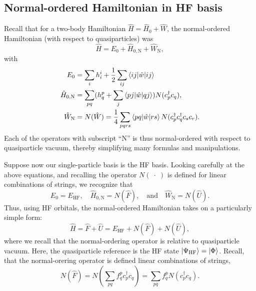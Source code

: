 \documentclass{report}
\theoremstyle{plain}
\theoremstyle{definition}
\begin{document}
\subsection{Normal-ordered Hamiltonian in HF basis}

Recall that for a two-body Hamiltonian $\hat{H} = \hat{H}_0 +
\hat{W}$, the normal-ordered Hamiltonian (with respect to
quasiparticles) was
\begin{equation}
  \hat{H} = E_0 + \hat{H}_{0,\text{N}} + \hat{W}_\text{N}, 
\end{equation}
with
\begin{align}
  E_0 &= \sum_i h^i_i + \frac{1}{2}\sum_{ij} \braket{ij|\hat{w}|ij} \\
  \hat{H}_{0,\text{N}} &= \sum_{pq} (h^p_q + \sum_j \braket{pj|\hat{w}|qj})
  N(c^\dag_p c_q), \\
  \hat{W}_\text{N} &= N(\hat{W}) = \frac{1}{4}\sum_{pqrs} \braket{pq|\hat{w}|rs} N(c^\dag_p
  c^\dag_q c_s c_r).
\end{align}
Each of the operators with subscript ``N'' is thus normal-ordered with
respect to quasiparticle vacuum, thereby simplifying many formulas and
manipulations.

Suppose now our single-particle basis is the HF basis.
Looking carefully at the above equations, and recalling the operator
$N(\; \cdot \;)$ is defined for linear combinations of strings, we recognize that
\begin{equation}
  E_0 = E_\text{HF}, \quad \hat{H}_{0,\text{N}} = N(\hat{F}), \quad\text{and}\quad \hat{W}_\text{N} =
  N(\hat{U}).
\end{equation}
Thus, using HF orbitals, the
normal-ordered Hamiltonian takes on a particularly simple form:
\begin{equation}
  \hat{H} = \hat{F} + \hat{U} = E_\text{HF} +
  N(\hat{F}) + N(\hat{U}),
\end{equation}
where we recall that the normal-ordering operator is relative to
quasiparticle vacuum. Here, the quasiparticle reference is the HF
state $\ket{\Psi_\text{HF}} = \ket{\Phi}$. Recall, that the
normal-orering operator is defined linear combinations of strings,
\begin{equation}
  N(\hat{F}) = N\left(\sum_{pq} f^{p}_q c^\dag_p c_q\right) =
  \sum_{pq} f^p_q N(c^\dag_p c_q).
\end{equation}
\end{document}
